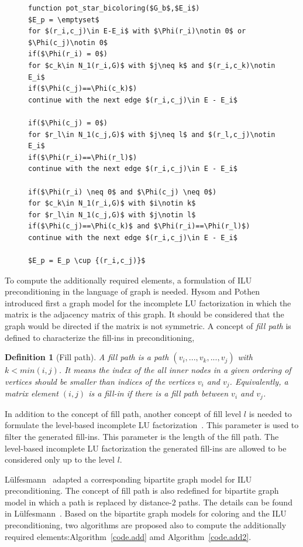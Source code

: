 \documentclass[12pt, twoside]{book}
\newtheorem{definition}{Definition}
\newcommand{\coderef}[1]{Algorithm~\protect\ref{#1}}
\begin{document}
\begin{figure}
\begin{lstlisting}[caption=Find potentially required elements for star bicoloring,label=code.pot.sb,mathescape]
function pot_star_bicoloring($G_b$,$E_i$)
$E_p = \emptyset$
for $(r_i,c_j)\in E-E_i$ with $\Phi(r_i)\notin 0$ or $\Phi(c_j)\notin 0$
if($\Phi(r_i) = 0$)
for $c_k\in N_1(r_i,G)$ with $j\neq k$ and $(r_i,c_k)\notin E_i$
if($\Phi(c_j)==\Phi(c_k)$)
continue with the next edge $(r_i,c_j)\in E - E_i$

if($\Phi(c_j) = 0$)
for $r_l\in N_1(c_j,G)$ with $j\neq l$ and $(r_l,c_j)\notin E_i$
if($\Phi(r_i)==\Phi(r_l)$)
continue with the next edge $(r_i,c_j)\in E - E_i$

if($\Phi(r_i) \neq 0$ and $\Phi(c_j) \neq 0$)
for $c_k\in N_1(r_i,G)$ with $i\notin k$
for $r_l\in N_1(c_j,G)$ with $j\notin l$
if($\Phi(c_j)==\Phi(c_k)$ and $\Phi(r_i)==\Phi(r_l)$)
continue with the next edge $(r_i,c_j)\in E - E_i$

$E_p = E_p \cup {(r_i,c_j)}$
\end{lstlisting}
\end{figure}

To compute the additionally required elements, a formulation of ILU preconditioning
in the language of graph is needed.
Hysom and Pothen~\cite{precond-pothen} introduced first a graph model for the incomplete
LU factorization in which the matrix is the adjacency matrix of this graph.
It should be considered that the graph would be directed if the matrix is not symmetric.
A concept of \textit{fill path} is defined to characterize the fill-ins in preconditioning,
\begin{definition}[Fill path]\label{d.fill.path}
A fill path is a path $(v_i,...,v_k,...,v_j)$ with
$k<min(i,j)$. It means the index of the all inner nodes in a given ordering of vertices
should be smaller than indices of the vertices $v_i$ and $v_j$.
Equivalently, a matrix element $(i,j)$ is a fill-in if there is a fill path between
$v_i$ and $v_j$.
\end{definition}
In addition to the concept of fill path, another concept of fill level $l$ is needed to
formulate the level-based incomplete LU factorization~\cite{precond-pothen}.
This parameter is used to filter the generated fill-ins.
This parameter is the length of the fill path.
The level-based incomplete LU factorization the generated fill-ins are allowed
to be considered only up to the level $l$.

Lülfesmann~\cite{Lulfesmann2012Fap} adapted a
corresponding bipartite graph model for ILU preconditioning.
The concept of fill path is also redefined for bipartite graph model
in which a path is replaced by distance-$2$ paths.
The details can be found in Lülfesmann~\cite{Lulfesmann2012Fap}.
Based on the bipartite graph models for coloring and the ILU preconditioning,
two algorithms are proposed also to compute the additionally required
elements:\coderef{code.add} amd \coderef{code.add2}.
\end{document}
